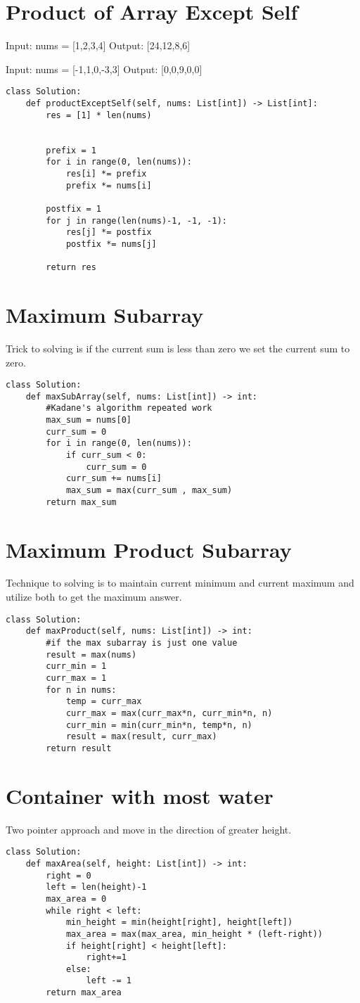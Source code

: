 \documentclass[24pt, a4]{article}
\begin{document}
\section{Product of Array Except Self}
Input: nums = [1,2,3,4]
Output: [24,12,8,6]

Input: nums = [-1,1,0,-3,3]
Output: [0,0,9,0,0]
\begin{lstlisting}
class Solution:
    def productExceptSelf(self, nums: List[int]) -> List[int]:
        res = [1] * len(nums)
        
        
        prefix = 1
        for i in range(0, len(nums)):
            res[i] *= prefix
            prefix *= nums[i]
            
        postfix = 1
        for j in range(len(nums)-1, -1, -1):
            res[j] *= postfix
            postfix *= nums[j]
        
        return res
\end{lstlisting}
\section{Maximum Subarray}
Trick to solving is if the current sum is less than zero we set the current sum to zero.
\begin{lstlisting}
class Solution:
    def maxSubArray(self, nums: List[int]) -> int:
        #Kadane's algorithm repeated work
        max_sum = nums[0]
        curr_sum = 0
        for i in range(0, len(nums)):
            if curr_sum < 0:
                curr_sum = 0
            curr_sum += nums[i]
            max_sum = max(curr_sum , max_sum)
        return max_sum
\end{lstlisting}
\section{Maximum Product Subarray}
Technique to solving is to maintain current minimum and current maximum and utilize both to get the maximum answer.
\begin{lstlisting}
class Solution:
    def maxProduct(self, nums: List[int]) -> int:
        #if the max subarray is just one value
        result = max(nums)
        curr_min = 1
        curr_max = 1
        for n in nums:
            temp = curr_max
            curr_max = max(curr_max*n, curr_min*n, n)
            curr_min = min(curr_min*n, temp*n, n)
            result = max(result, curr_max)
        return result
\end{lstlisting}
\section{Container with most water}
Two pointer approach and move in the direction of greater height.
\begin{lstlisting}
class Solution:
    def maxArea(self, height: List[int]) -> int:
        right = 0
        left = len(height)-1
        max_area = 0
        while right < left:
            min_height = min(height[right], height[left])
            max_area = max(max_area, min_height * (left-right))
            if height[right] < height[left]:
                right+=1
            else:
                left -= 1
        return max_area
\end{lstlisting}
\end{document}
